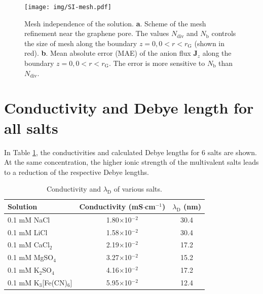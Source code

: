 \documentclass[journal=langd5,email=true, hyperref=true, keywords=false]{achemso}
\begin{document}
\begin{figure}[htbp]
  \centering
  \texttt{[image: img/SI-mesh.pdf]}
  \caption{Mesh independence of the solution. \textbf{a}. Scheme of
    the mesh refinement near the graphene pore. The values
    $N_{\mathrm{div}}$ and $N_{\mathrm{b}}$ controls the size of mesh
    along the boundary $z=0, 0<r<r_{\mathrm{G}}$ (shown in
    red). \textbf{b}. Mean absolute error (MAE) of the anion flux
    $\boldsymbol{J}_{z}$ along the boundary $z=0,
    0<r<r_{\mathrm{G}}$. The error is more sensitive to
    $N_{\mathrm{b}}$ than $N_{\mathrm{div}}$.}
  \label{fig:mesh}
\end{figure}

\section{Conductivity and Debye length for all salts}
\label{sec:salts}
In Table \ref{tab:conductivity}, the conductivities and calculated Debye
lengths for 6 salts are shown. At the same concentration, the higher
ionic strength of the multivalent salts leads to a reduction of the
respective Debye lengths.

\begin{table}[htbp]
  \centering
  \begin{tabular}{lcc}
    \hline
    Solution & Conductivity (mS$\cdot$cm$^{-1}$) & $\lambda_{\mathrm{D}}$ (nm) \\
    \hline
    0.1 mM NaCl &1.80$\times$10$^{-2}$  &30.4\\
    0.1 mM LiCl &1.58$\times$10$^{-2}$ &30.4\\
    0.1 mM CaCl$_{2}$&  2.19$\times$10$^{-2}$ &17.2\\
    0.1 mM MgSO$_{4}$   &3.27$\times$10$^{-2}$ &15.2\\
    0.1 mM K$_{2}$SO$_{4}$      &4.16$\times$10$^{-2}$ &17.2\\
    0.1 mM K$_{3}$[Fe(CN)$_{6}$]&       5.95$\times$10$^{-2}$  &12.4\\
    \hline
  \end{tabular}
  \caption{Conductivity and $\lambda_{\mathrm{D}}$ of various salts.}
  \label{tab:conductivity}
\end{table}
\end{document}
